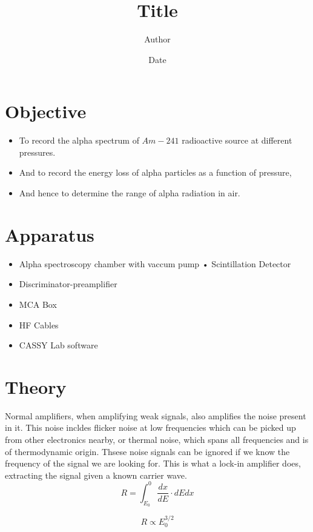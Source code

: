 \documentclass[a4paper]{article}
\title{\textbf{Title}}
\author{Author}
\date{Date}
\providecommand{\tightlist}{%
\setlength{\itemsep}{0pt}\setlength{\parskip}{0pt}}
\begin{document}
\maketitle

\hypertarget{objective}{%
\section{Objective}\label{objective}}

\begin{itemize}
\tightlist
\item
To record the alpha spectrum of \(Am-241\) radioactive source at
different pressures.
\item
And to record the energy loss of alpha particles as a function of
pressure,
\item
And hence to determine the range of alpha radiation in air.
\end{itemize}

\hypertarget{apparatus}{%
\section{Apparatus}\label{apparatus}}

\begin{itemize}
\tightlist
\item
Alpha spectroscopy chamber with vaccum pump • Scintillation Detector
\item
Discriminator-preamplifier
\item
MCA Box
\item
HF Cables
\item
CASSY Lab software
\end{itemize}

\hypertarget{theory}{%
\section{Theory}\label{theory}}

Normal amplifiers, when amplifying weak signals, also amplifies the
noise present in it. This noise incldes flicker noise at low frequencies
which can be picked up from other electronics nearby, or thermal noise,
which spans all frequencies and is of thermodynamic origin. Thsese noise
signals can be ignored if we know the frequency of the signal we are
looking for. This is what a lock-in amplifier does, extracting the
signal given a known carrier wave. \[
R=\int_{E_0}^0 \frac{dx}{dE}\cdot dE dx
\]

\[
R \propto E_0^{3/2}
\]
\end{document}
